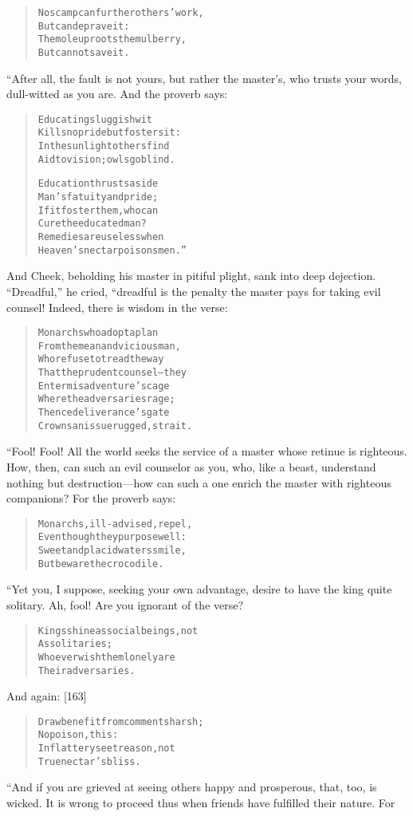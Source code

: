 \documentclass[article, twoside, 14pt]{memoir}
\renewenvironment{verbatim}{%
\begin{quote}%
\vskip -10pt%
\begin{alltt}\normalfont\large}{\end{alltt}%
\end{quote}%
\vskip -10pt
} %
\begin{document}
\begin{verbatim}
No scamp can further others' work,
    But can deprave it:
The mole uproots the mulberry,
    But cannot save it.
\end{verbatim}
“After all, the fault is not yours, but rather the master's, who
trusts your words, dull-witted as you are. And the proverb says:

\begin{verbatim}
Educating sluggish wit
Kills no pride but fosters it:
In the sunlight others find
Aid to vision; owls go blind.

Education thrusts aside
Man's fatuity and pride;
If it foster them, who can
Cure the educated man?
Remedies are useless when
Heaven's nectar poisons men.”
\end{verbatim}
And Cheek, beholding his master in pitiful plight, sank into deep
dejection. ``Dreadful,'' he cried, “dreadful is the penalty the
master pays for taking evil counsel! Indeed, there is wisdom in the
verse:

\begin{verbatim}
Monarchs who adopt a plan
From the mean and vicious man,
Who refuse to tread the way
That the prudent counsel--they
Enter misadventure's cage
Where the adversaries rage;
Thence deliverance's gate
Crowns an issue rugged, strait.
\end{verbatim}
“Fool! Fool! All the world seeks the service of a master whose
retinue is righteous. How, then, can such an evil counselor as you,
who, like a beast, understand nothing but destruction---how can
such a one enrich the master with righteous companions? For the
proverb says:

\begin{verbatim}
Monarchs, ill-advised, repel,
Even though they purpose well:
Sweet and placid waters smile,
But beware the crocodile.
\end{verbatim}
“Yet you, I suppose, seeking your own advantage, desire to have the
king quite solitary. Ah, fool! Are you ignorant of the verse?

\begin{verbatim}
Kings shine as social beings, not
    As solitaries;
Whoever wish them lonely are
    Their adversaries.
\end{verbatim}
And again: [163]

\begin{verbatim}
Draw benefit from comments harsh;
    No poison, this:
In flattery see treason, not
    True nectar's bliss.
\end{verbatim}
“And if you are grieved at seeing others happy and prosperous,
that, too, is wicked. It is wrong to proceed thus when friends have
fulfilled their nature. For
\end{document}
